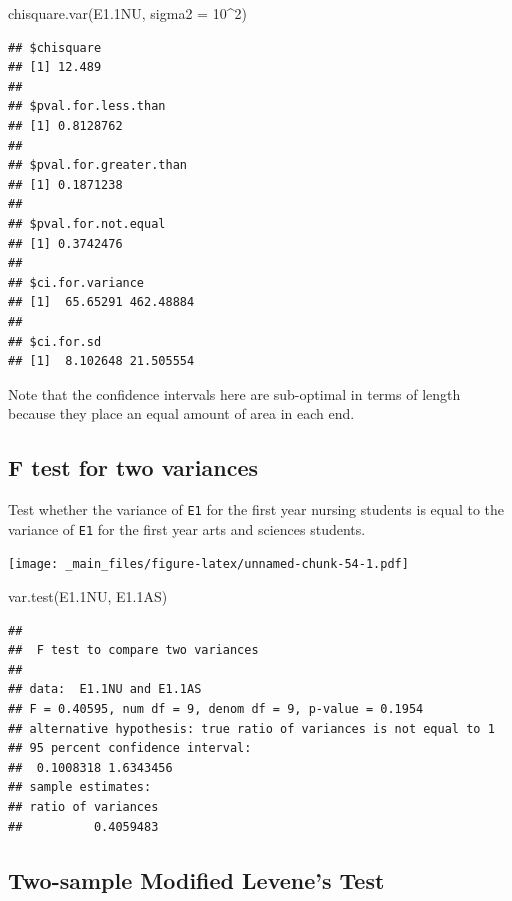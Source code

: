 \documentclass[
]{book}
\newenvironment{Shaded}{\begin{snugshade}}{\end{snugshade}}
\newcommand{\AttributeTok}[1]{\textcolor[rgb]{0.77,0.63,0.00}{#1}}
\newcommand{\DecValTok}[1]{\textcolor[rgb]{0.00,0.00,0.81}{#1}}
\newcommand{\FloatTok}[1]{\textcolor[rgb]{0.00,0.00,0.81}{#1}}
\newcommand{\FunctionTok}[1]{\textcolor[rgb]{0.00,0.00,0.00}{#1}}
\newcommand{\NormalTok}[1]{#1}
\newcommand{\SpecialCharTok}[1]{\textcolor[rgb]{0.00,0.00,0.00}{#1}}
\begin{document}
\begin{Shaded}
\begin{Highlighting}[]
\FunctionTok{chisquare.var}\NormalTok{(E1}\FloatTok{.1}\NormalTok{NU, }\AttributeTok{sigma2 =} \DecValTok{10}\SpecialCharTok{\^{}}\DecValTok{2}\NormalTok{)}
\end{Highlighting}
\end{Shaded}

\begin{verbatim}
## $chisquare
## [1] 12.489
## 
## $pval.for.less.than
## [1] 0.8128762
## 
## $pval.for.greater.than
## [1] 0.1871238
## 
## $pval.for.not.equal
## [1] 0.3742476
## 
## $ci.for.variance
## [1]  65.65291 462.48884
## 
## $ci.for.sd
## [1]  8.102648 21.505554
\end{verbatim}

Note that the confidence intervals here are sub-optimal in terms of length because they place an equal amount of area in each end.

\hypertarget{f-test-for-two-variances}{%
\subsection{F test for two variances}\label{f-test-for-two-variances}}

Test whether the variance of \texttt{E1} for the first year nursing students is equal to the variance of \texttt{E1} for the first year arts and sciences students.

\texttt{[image: \_main\_files/figure-latex/unnamed-chunk-54-1.pdf]}

\begin{Shaded}
\begin{Highlighting}[]
\FunctionTok{var.test}\NormalTok{(E1}\FloatTok{.1}\NormalTok{NU, E1}\FloatTok{.1}\NormalTok{AS)}
\end{Highlighting}
\end{Shaded}

\begin{verbatim}
## 
##  F test to compare two variances
## 
## data:  E1.1NU and E1.1AS
## F = 0.40595, num df = 9, denom df = 9, p-value = 0.1954
## alternative hypothesis: true ratio of variances is not equal to 1
## 95 percent confidence interval:
##  0.1008318 1.6343456
## sample estimates:
## ratio of variances 
##          0.4059483
\end{verbatim}

\hypertarget{two-sample-modified-levenes-test}{%
\subsection{Two-sample Modified Levene's Test}\label{two-sample-modified-levenes-test}}
\end{document}
